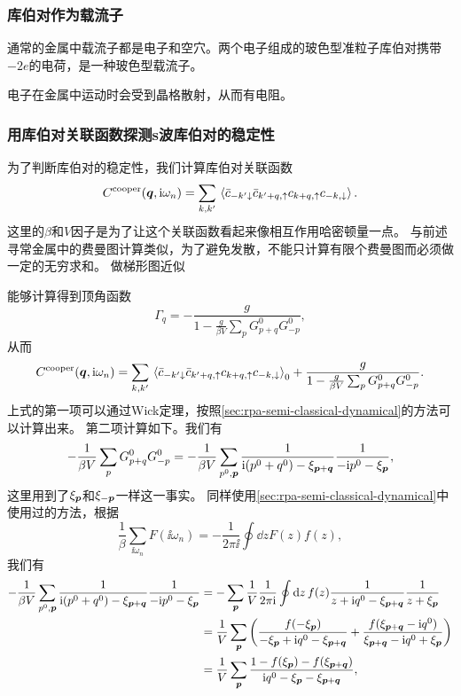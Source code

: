 \subsubsection{库伯对作为载流子}

通常的金属中载流子都是电子和空穴。两个电子组成的玻色型准粒子库伯对携带$-2e$的电荷，是一种玻色型载流子。

电子在金属中运动时会受到晶格散射，从而有电阻。

\subsubsection{用库伯对关联函数探测s波库伯对的稳定性}

为了判断库伯对的稳定性，我们计算库伯对关联函数
\begin{equation}
    C^\text{cooper}(\vb*{q}, \mathrm{i} \omega_n) = \sum_{k, k'} \expval*{\bar{c}_{-k' \downarrow} \bar{c}_{k'+q, \uparrow} c_{k+q, \uparrow} c_{-k, \downarrow}}.
\end{equation}
这里的$\beta$和$V$因子是为了让这个关联函数看起来像相互作用哈密顿量一点。
与前述寻常金属中的费曼图计算类似，为了避免发散，不能只计算有限个费曼图而必须做一定的无穷求和。
做梯形图近似

能够计算得到顶角函数
\begin{equation}
    \Gamma_q = - \frac{g}{1 - \frac{g}{\beta V} \sum_{p} G^0_{p+q} G^0_{-p}} ,
    \label{eq:bcs-four-e-vertex-eff}
\end{equation}
从而
\begin{equation}
    C^\text{cooper}(\vb*{q}, \mathrm{i} \omega_n) = \sum_{k, k'} \expval*{\bar{c}_{-k' \downarrow} \bar{c}_{k'+q, \uparrow} c_{k+q, \uparrow} c_{-k, \downarrow}}_0 + \frac{g}{1 - \frac{g}{\beta V} \sum_{p} G^0_{p+q} G^0_{-p}}.
    \label{eq:bcs-cooper-pair-correlation}
\end{equation}
上式的第一项可以通过Wick定理，按照\autoref{sec:rpa-semi-classical-dynamical}的方法可以计算出来。
第二项计算如下。我们有
\[
    - \frac{1}{\beta V} \sum_p G^0_{p+q} G^0_{-p} = - \frac{1}{\beta V} \sum_{p^0, \vb*{p}} \frac{1}{\mathrm{i} (p^0 + q^0) - \xi_{\vb*{p} + \vb*{q}}} \frac{1}{- \mathrm{i} p^0 - \xi_{\vb*{p}}},
\]
这里用到了$\xi_{\vb*{p}}$和$\xi_{-\vb*{p}}$一样这一事实。
同样使用\autoref{sec:rpa-semi-classical-dynamical}中使用过的方法，根据
\[
    \frac{1}{\beta} \sum_{\ii \omega_n} F(\ii \omega_n) = - \frac{1}{2\pi \ii} \oint \dd{z} F(z) f(z),
\]
我们有
\[
    \begin{aligned}
        - \frac{1}{\beta V} \sum_{p^0, \vb*{p}} \frac{1}{\mathrm{i} (p^0 + q^0) - \xi_{\vb*{p} + \vb*{q}}} \frac{1}{- \mathrm{i} p^0 - \xi_{\vb*{p}}} &= - \sum_{\vb*{p}} \frac{1}{V} \frac{1}{2\pi \mathrm{i}} \oint \dd{z} f(z) \frac{1}{z + \mathrm{i} q^0 - \xi_{\vb*{p}+\vb*{q}}} \frac{1}{z+\xi_{\vb*{p}}} \\
        &= \frac{1}{V} \sum_{\vb*{p}} \left( \frac{f(-\xi_{\vb*{p}})}{- \xi_{\vb*{p}} + \mathrm{i} q^0 - \xi_{\vb*{p}+\vb*{q}}} + \frac{f(\xi_{\vb*{p}+\vb*{q}} - \mathrm{i} q^0)}{\xi_{\vb*{p}+\vb*{q}} - \mathrm{i} q^0 + \xi_{\vb*{p}}} \right) \\
        &= \frac{1}{V} \sum_{\vb*{p}} \frac{1 - f(\xi_{\vb*{p}}) - f(\xi_{\vb*{p}+\vb*{q}})}{\mathrm{i} q^0 - \xi_{\vb*{p}} - \xi_{\vb*{p} + \vb*{q}}},
    \end{aligned}
\]
